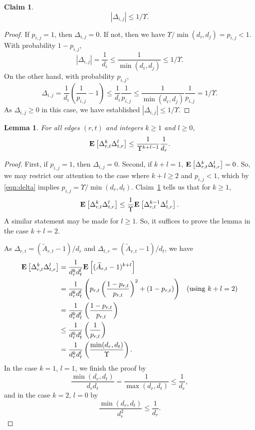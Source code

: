 \documentclass[11pt]{article}
\newtheorem{lemma}[theorem]{Lemma}
\newtheorem{claim}[theorem]{Claim}
\def\Atil{\widetilde{A}}
\def\expec#1#2{\mbox{\bf E}_{#1}\left[ #2 \right]}
\def\abs#1{\left|#1  \right|}
\def\abs#1{\left|#1  \right|}
\begin{document}
\begin{claim}\label{clm:magnitude}
\[
\abs{\Delta_{i,j}}
\leq 1/\Upsilon .
\]
\end{claim}
\begin{proof}
If $p_{i,j} = 1$, then $\Delta_{i,j} = 0$.
If not, then we have $\Upsilon / \min (d_{i}, d_{j}) = p_{i,j} < 1$.
With probability $1-p_{i,j}$,
\[
\abs{\Delta_{i,j}} = \frac{1}{d_{i}} \leq \frac{1}{\min (d_{i}, d_{j})}
 \leq  1/ \Upsilon.
\]
On the other hand, with probability $p_{i,j}$,
\[
\Delta_{i,j} = \frac{1}{d_{i}}\left(\frac{1}{p_{i,j}} - 1 \right)
\leq \frac{1}{d_{i}} \frac{1}{p_{i,j}}
\leq \frac{1}{\min (d_{i}, d_{j})} \frac{1}{p_{i,j}}
= 1/\Upsilon.
\]
As $\Delta_{i,j} \geq 0$ in this case, we have established
  $\abs{\Delta_{i,j}} \leq 1/\Upsilon$.
\end{proof}

\begin{lemma}\label{lem:edgeExpec}
For all edges $(r,t)$ and integers $k \geq 1$ and $l \geq 0$,
\[
  \expec{}{\Delta_{r,t}^{k} \Delta_{t,r}^{l}}
\leq
\frac{1}{\Upsilon ^{k+l - 1}}
\frac{1}{d_{r}}.
\]
\end{lemma}
\begin{proof}
First, if $p_{i,j} = 1$, then $\Delta_{i,j} = 0$.
Second, if $k + l = 1$, $\expec{}{\Delta_{r,t}^{k} \Delta_{t,r}^{l}} = 0$.
So, we may restrict our attention to the case where $k + l \geq 2$ and $p_{i,j} < 1$,
  which by \eqref{eqn:delta} implies $p_{i,j} = \Upsilon / \min (d_{r}, d_{t})$.
Claim~\ref{clm:magnitude} tells us that for $k \geq 1$,
\[
  \expec{}{\Delta_{r,t}^{k} \Delta_{t,r}^{l}}
\leq
\frac{1}{\Upsilon }
  \expec{}{\Delta_{r,t}^{k-1} \Delta_{t,r}^{l}}.
\]
A similar statement may be made for $l \geq 1$.
So, it suffices to prove the lemma in the case
  $k + l = 2$.


As $\Delta_{r,t} = (\Atil_{r,t} -1 )/ d_{r}$ and
  $\Delta_{t,r} = (\Atil_{r,t} -1 )/ d_{t}$, we have
\begin{align*}
\expec{}{\Delta_{r,t}^{k} \Delta_{t,r}^{l}}
& =
\frac{1}{d_{r}^{k} d_{t}^{l}}
\expec{}{(\Atil_{r,t} -1 )^{k+l}}
\\
& =
\frac{1}{d_{r}^{k} d_{t}^{l}}
\left(
p_{r,t}
\left(\frac{1 - p_{r,t}}{p_{r,t}} \right)^{2}
+
(1- p_{r,t})
 \right) & (\text{using $k + l = 2$})\\
& =
\frac{1}{d_{r}^{k} d_{t}^{l}}
\left(\frac{1 - p_{r,t}}{p_{r,t}} \right)
\\
& \leq
\frac{1}{d_{r}^{k} d_{t}^{l}}
\left(\frac{1}{p_{r,t}} \right)
\\
& =
\frac{1}{d_{r}^{k} d_{t}^{l}}
\left(\frac{\min (d_{r}, d_{t})}{\Upsilon} \right).
\end{align*}
In the case $k = 1$, $l = 1$, we finish the proof by
\[
\frac{\min (d_{r}, d_{t})}{d_{r} d_{t}}
 =
\frac{1}{\max (d_{r}, d_{t})}
\leq
\frac{1}{d_{r}},
\]
and in the case $k = 2$, $l = 0$ by
\[
\frac{\min (d_{r}, d_{t})}{d_{r}^{2}}
\leq
\frac{1}{d_{r}}.
\]
\end{proof}
\end{document}
